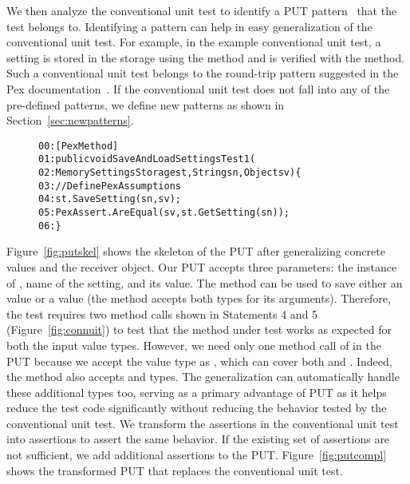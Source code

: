 We then analyze the conventional unit test to identify a PUT
pattern~\cite{PEXDOC} that the test belongs to. Identifying a pattern can help in
easy generalization of the conventional unit test.
For example, in the example conventional
unit test, a setting is stored in the storage using the 
method and is verified with the  method.
Such a conventional unit test belongs to the round-trip pattern suggested in the
Pex documentation~\cite{PEXDOC, halleux08:putpatterns}. If the conventional unit test does not 
fall into any of the pre-defined patterns, we define new patterns as shown in Section~\ref{sec:newpatterns}.

\begin{figure}[t]
\begin{CodeOut}
\begin{alltt}
00:[PexMethod]
01:public void SaveAndLoadSettingsTest1(
02:\hspace*{0.1in}MemorySettingsStorage st, String sn, Object sv) \{
03:\hspace*{0.2in}//Define Pex Assumptions
04:\hspace*{0.2in}st.SaveSetting(sn, sv);
05:\hspace*{0.2in}PexAssert.AreEqual(sv, st.GetSetting(sn));
06:\}
\end{alltt}
\end{CodeOut}
\end{figure}

Figure~\ref{fig:putskel} shows the skeleton of the PUT after generalizing concrete values and the receiver object.
Our PUT accepts three parameters: the instance of , 
name of the setting, and its value. The  method can be used to save either an  value or a  value (the method accepts both types for its arguments). Therefore, the test requires two method calls
shown in Statements 4 and 5 (Figure~\ref{fig:connuit}) to test that the method under test works as expected for both the input value types. However, we need only one method
call of  in the PUT because we accept the value type as ,
which can cover both  and . 
Indeed, the  method also accepts 
and  types. The generalization can automatically handle
these additional types too, serving as a 
primary advantage of PUT as it helps reduce the test code significantly
without reducing the behavior tested by the conventional unit test.
We transform the assertions in the conventional unit test into
 assertions to assert the same behavior. If the existing
set of assertions are not sufficient, we add additional assertions to the PUT. Figure~\ref{fig:putcompl} shows
the transformed PUT that replaces the conventional unit test.

